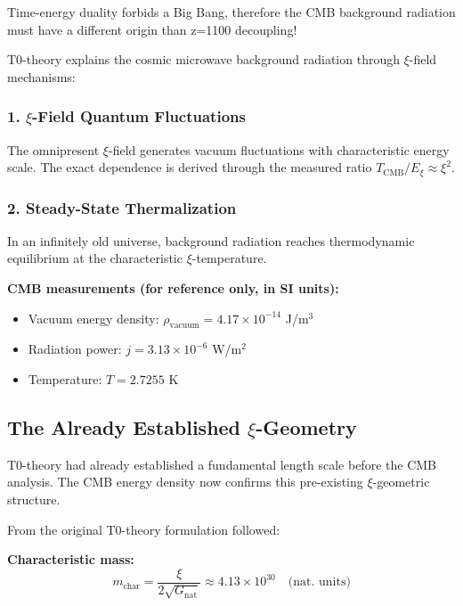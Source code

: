 	\begin{revolutionary}
		Time-energy duality forbids a Big Bang, therefore the CMB background radiation must have a different origin than z=1100 decoupling!
	\end{revolutionary}
	
	T0-theory explains the cosmic microwave background radiation through $\xi$-field mechanisms:
	
	\subsubsection{1. $\xi$-Field Quantum Fluctuations}
	The omnipresent $\xi$-field generates vacuum fluctuations with characteristic energy scale. The exact dependence is derived through the measured ratio $T_{\text{CMB}}/E_\xi \approx \xi^2$.
	
	\subsubsection{2. Steady-State Thermalization}
	In an infinitely old universe, background radiation reaches thermodynamic equilibrium at the characteristic $\xi$-temperature.
	
	\begin{sibox}
		\textbf{CMB measurements (for reference only, in SI units):}
		\begin{itemize}
			\item Vacuum energy density: $\rho_{\text{vacuum}} = 4.17 \times 10^{-14}$ J/m$^3$
			\item Radiation power: $j = 3.13 \times 10^{-6}$ W/m$^2$
			\item Temperature: $T = 2.7255$ K
		\end{itemize}
	\end{sibox}
	
	\subsection{The Already Established $\xi$-Geometry}
	
	\begin{important}
		T0-theory had already established a fundamental length scale before the CMB analysis. The CMB energy density now confirms this pre-existing $\xi$-geometric structure.
	\end{important}
	
	From the original T0-theory formulation followed:
	
	\textbf{Characteristic mass:}
	\begin{equation}
		m_{\text{char}} = \frac{\xi}{2\sqrt{G_{\text{nat}}}} \approx 4.13 \times 10^{30} \quad \text{(nat. units)}
	\end{equation}
	
